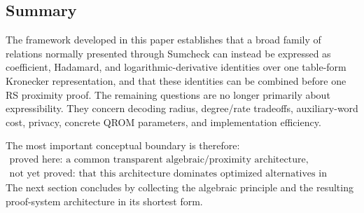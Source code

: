 \subsection{Summary}
\label{sec:limitations-summary}

The framework developed in this paper establishes that a broad family of relations normally presented through Sumcheck can instead be expressed as coefficient, Hadamard, and logarithmic-derivative identities over one table-form Kronecker representation, and that these identities can be combined before one RS proximity proof.  The remaining questions are no longer primarily about expressibility.  They concern decoding radius, degree/rate tradeoffs, auxiliary-word cost, privacy, concrete QROM parameters, and implementation efficiency.

The most important conceptual boundary is therefore:
\begin{equation}
  \boxed{
  \begin{gathered}
    \text{proved here: a common transparent algebraic/proximity architecture},\\
    \text{not yet proved: that this architecture dominates optimized alternatives in practice.}
  \end{gathered}}
  \label{eq:limitations-final-boundary}
\end{equation}
The next section concludes by collecting the algebraic principle and the resulting proof-system architecture in its shortest form.
